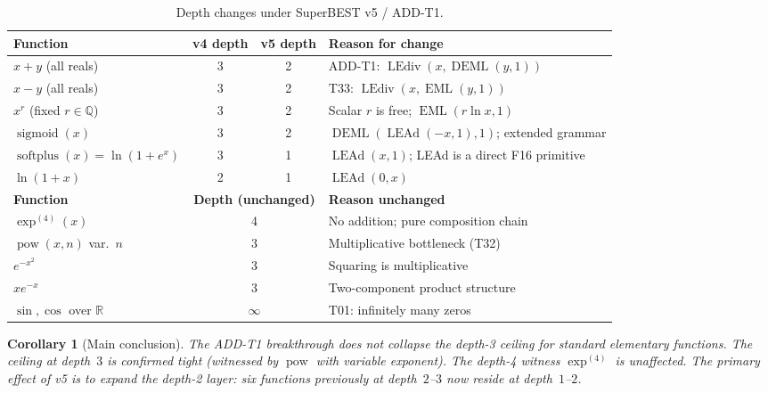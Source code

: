 \documentclass[12pt,a4paper]{article}
\newtheorem{corollary}[theorem]{Corollary}
\theoremstyle{definition}
\theoremstyle{remark}
\newcommand{\EML}{\operatorname{EML}}
\newcommand{\DEML}{\operatorname{DEML}}
\newcommand{\LEAd}{\operatorname{LEAd}}
\newcommand{\LEdiv}{\operatorname{LEdiv}}
\newcommand{\powop}{\operatorname{pow}}
\newcommand{\sigmoid}{\operatorname{sigmoid}}
\newcommand{\softplus}{\operatorname{softplus}}
\newcommand{\R}{\mathbb{R}}
\newcommand{\Q}{\mathbb{Q}}
\begin{document}
\begin{table}[h]
\centering
\caption{Depth changes under SuperBEST v5 / ADD-T1.}
\label{tab:changes}
\smallskip
\begin{tabular}{@{}lccp{5.5cm}@{}}
\toprule
\textbf{Function} & \textbf{v4 depth} & \textbf{v5 depth} & \textbf{Reason for change} \\
\midrule
$x+y$ (all reals)       & 3 & 2 & ADD-T1: $\LEdiv(x,\DEML(y,1))$ \\
$x-y$ (all reals)       & 3 & 2 & T33: $\LEdiv(x,\EML(y,1))$ \\
$x^r$ (fixed $r\in\Q$)  & 3 & 2 & Scalar $r$ is free; $\EML(r\ln x,1)$ \\
$\sigmoid(x)$           & 3 & 2 & $\DEML(\LEAd(-x,1),1)$; extended grammar \\
$\softplus(x)=\ln(1+e^x)$ & 3 & 1 & $\LEAd(x,1)$; LEAd is a direct F16 primitive \\
$\ln(1+x)$              & 2 & 1 & $\LEAd(0,x)$ \\
\midrule
\textbf{Function} & \multicolumn{2}{c}{\textbf{Depth (unchanged)}} & \textbf{Reason unchanged} \\
\midrule
$\exp^{(4)}(x)$         & \multicolumn{2}{c}{4} & No addition; pure composition chain \\
$\powop(x,n)$ var.\ $n$ & \multicolumn{2}{c}{3} & Multiplicative bottleneck (T32) \\
$e^{-x^2}$              & \multicolumn{2}{c}{3} & Squaring is multiplicative \\
$x e^{-x}$              & \multicolumn{2}{c}{3} & Two-component product structure \\
$\sin,\cos$ over $\R$   & \multicolumn{2}{c}{$\infty$} & T01: infinitely many zeros \\
\bottomrule
\end{tabular}
\end{table}

\begin{corollary}[Main conclusion]
The ADD-T1 breakthrough does \emph{not} collapse the depth-3 ceiling for
standard elementary functions.  The ceiling at depth~$3$ is confirmed tight
(witnessed by $\powop$ with variable exponent).  The depth-4 witness
$\exp^{(4)}$ is unaffected.  The primary effect of v5 is to expand the depth-2
layer: six functions previously at depth~$2$--$3$ now reside at depth~$1$--$2$.
\end{corollary}

\end{document}
